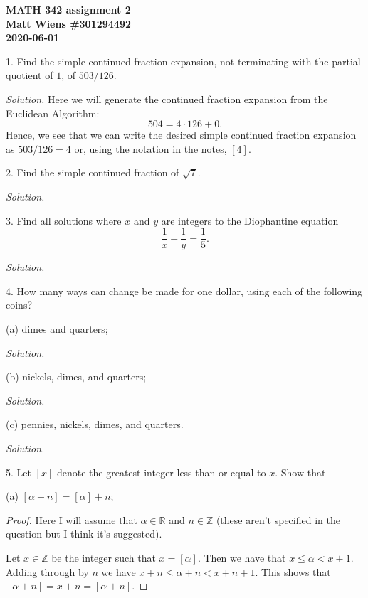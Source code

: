 \documentclass{article}
\newcommand{\R}{\mathbb{R}}
\newcommand{\Z}{\mathbb{Z}}
\begin{document}
\textbf{MATH 342 assignment 2} \\
\textbf{Matt Wiens \#301294492} \\
\textbf{2020-06-01}

1. Find the simple continued fraction expansion, not terminating with
   the partial quotient of $1$, of $503/126$.

\textit{Solution.}
Here we will generate the continued fraction expansion from the
Euclidean Algorithm:
%
\begin{equation*}
    504 = 4 \cdot 126 + 0
    .
\end{equation*}
%
Hence, we see that we can write the desired simple continued fraction
expansion as $503 / 126 = 4$ or, using the notation in the notes, $[4]$.

\newpage

2. Find the simple continued fraction of $\sqrt{7}$.

\textit{Solution.}

\newpage

3. Find all solutions where $x$ and $y$ are integers to the Diophantine
   equation
%
\begin{equation*}
    \frac{1}{x} + \frac{1}{y} = \frac{1}{5}
    .
\end{equation*}

\textit{Solution.}

\newpage

4. How many ways can change be made for one dollar, using each of the following coins?

(a) dimes and quarters;

\textit{Solution.}

\vspace{5mm}

(b) nickels, dimes, and quarters;

\textit{Solution.}

\vspace{5mm}

(c) pennies, nickels, dimes, and quarters.

\textit{Solution.}

\newpage

5. Let $[x]$ denote the greatest integer less than or equal to $x$. Show that

(a) $[\alpha + n] = [\alpha] + n$;

\begin{proof}

Here I will assume that $\alpha \in \R$ and $n \in \Z$ (these aren't
specified in the question but I think it's suggested).

Let $x \in \Z$ be the integer such that $x = [\alpha]$. Then we have
that $x \leq \alpha < x + 1$. Adding through by $n$ we have $x + n \leq
\alpha + n < x + n + 1$. This shows that $[\alpha + n] = x + n = [\alpha
+ n]$.

\end{proof}
\end{document}
